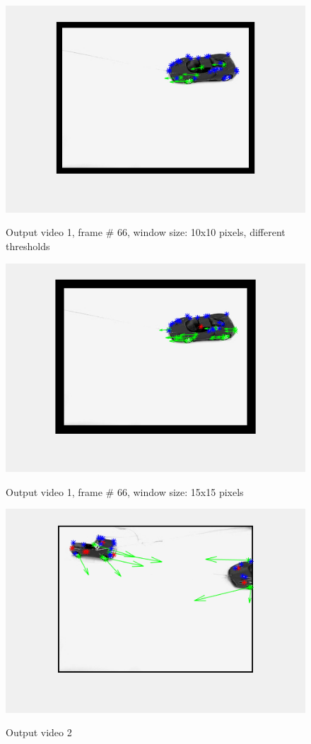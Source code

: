 \documentclass[11pt]{article}
\begin{document}
\begin{figure}[H]
	\centering
	{\includegraphics[width=12cm]{images/out_1_66_w10x10_2.png} }
    \caption{Output video 1, frame \# 66, window size: 10x10 pixels, different thresholds}
    \label{fig:out1_5}
\end{figure}

\begin{figure}[H]
	\centering
	{\includegraphics[width=12cm]{images/out_1_66_w15x15.png} }
    \caption{Output video 1, frame \# 66, window size: 15x15 pixels}
    \label{fig:out1_6}
\end{figure}

\begin{figure}[H]
	\centering
	{\includegraphics[width=12cm]{images/out_2.png} }
    \caption{Output video 2}
    \label{fig:out2}
\end{figure}
\end{document}
